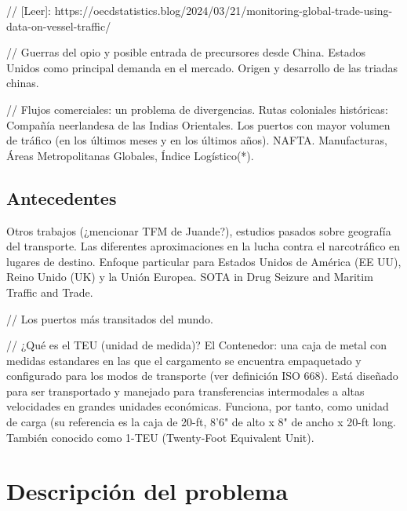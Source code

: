 \documentclass{article}
\begin{document}
// [Leer]: https://oecdstatistics.blog/2024/03/21/monitoring-global-trade-using-data-on-vessel-traffic/



// Guerras del opio y posible entrada de precursores desde China. Estados Unidos como principal demanda en el mercado. Origen y desarrollo de las triadas chinas.

// Flujos comerciales: un problema de divergencias. Rutas coloniales históricas: Compañía neerlandesa de las Indias Orientales. Los puertos con mayor volumen de tráfico (en los últimos meses y en los últimos años). NAFTA. Manufacturas, Áreas Metropolitanas Globales, Índice Logístico(*).



\subsection{Antecedentes}
Otros trabajos (¿mencionar TFM de Juande?), estudios pasados sobre geografía del transporte.
Las diferentes aproximaciones en la lucha contra el narcotráfico en lugares de destino. Enfoque particular para Estados Unidos de América (EE UU), Reino Unido (UK) y la Unión Europea.
SOTA in Drug Seizure and Maritim Traffic and Trade.

// Los puertos más transitados del mundo.

// ¿Qué es el TEU (unidad de medida)?
El Contenedor: una caja de metal con medidas estandares en las que el cargamento se encuentra empaquetado y configurado para los modos de transporte (ver definición ISO 668). Está diseñado para ser transportado y manejado para transferencias intermodales a altas velocidades en grandes unidades económicas. Funciona, por tanto, como unidad de carga (su referencia es la caja de 20-ft, 8'6" de alto x 8" de ancho x 20-ft long. También conocido como 1-TEU (Twenty-Foot Equivalent Unit).

\section{Descripción del problema}
\end{document}
